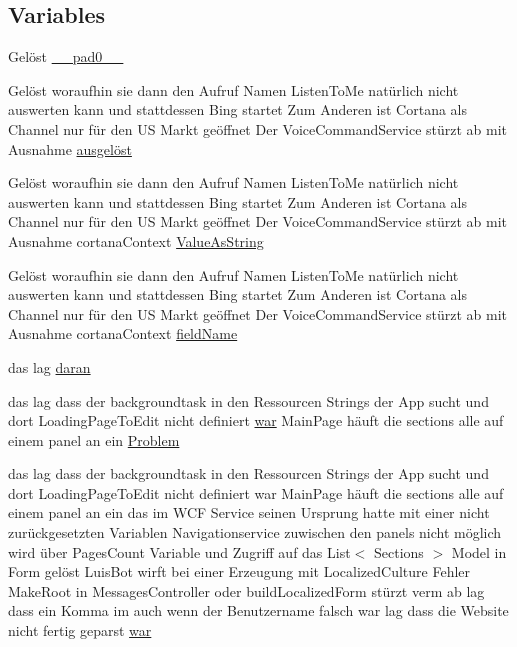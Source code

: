 \subsection*{Variables}
\begin{DoxyCompactItemize}
\item 
Gelöst \hyperlink{_r_e_a_d_m_e_8txt_a38ccef022a886075e294ad30cbfcae20}{\+\_\+\+\_\+pad0\+\_\+\+\_\+}
\item 
Gelöst woraufhin sie dann den Aufruf Namen Listen\+To\+Me natürlich nicht auswerten kann und stattdessen Bing startet Zum Anderen ist Cortana als Channel nur für den US Markt geöffnet Der Voice\+Command\+Service stürzt ab mit Ausnahme \hyperlink{_r_e_a_d_m_e_8txt_ae87c321689a82617b1f79b2274e0c802}{ausgelöst}
\item 
Gelöst woraufhin sie dann den Aufruf Namen Listen\+To\+Me natürlich nicht auswerten kann und stattdessen Bing startet Zum Anderen ist Cortana als Channel nur für den US Markt geöffnet Der Voice\+Command\+Service stürzt ab mit Ausnahme cortana\+Context \hyperlink{_r_e_a_d_m_e_8txt_a5efed622080494c17160e34d1aa15886}{Value\+As\+String}
\item 
Gelöst woraufhin sie dann den Aufruf Namen Listen\+To\+Me natürlich nicht auswerten kann und stattdessen Bing startet Zum Anderen ist Cortana als Channel nur für den US Markt geöffnet Der Voice\+Command\+Service stürzt ab mit Ausnahme cortana\+Context \hyperlink{_r_e_a_d_m_e_8txt_a225ecf32ab26301c2eb46c45696e77a2}{field\+Name}
\item 
das lag \hyperlink{_r_e_a_d_m_e_8txt_a135543df2f8a787ac2ddeaf87194562c}{daran}
\item 
das lag dass der backgroundtask in den Ressourcen Strings der App sucht und dort Loading\+Page\+To\+Edit nicht definiert \hyperlink{_r_e_a_d_m_e_8txt_a2a72fc7da943588cba8c302409b22e53}{war} Main\+Page häuft die sections alle auf einem panel an ein \hyperlink{_r_e_a_d_m_e_8txt_a86dd00a8c1f3448e32e23bece4a957d6}{Problem}
\item 
das lag dass der backgroundtask in den Ressourcen Strings der App sucht und dort Loading\+Page\+To\+Edit nicht definiert war Main\+Page häuft die sections alle auf einem panel an ein das im W\+CF Service seinen Ursprung hatte mit einer nicht zurückgesetzten Variablen Navigationservice zuwischen den panels nicht möglich wird über Pages\+Count Variable und Zugriff auf das List$<$ Sections $>$ Model in Form gelöst Luis\+Bot wirft bei einer Erzeugung mit Localized\+Culture Fehler Make\+Root in Messages\+Controller oder build\+Localized\+Form stürzt verm ab lag dass ein Komma im auch wenn der Benutzername falsch war lag dass die Website nicht fertig geparst \hyperlink{_r_e_a_d_m_e_8txt_a2a72fc7da943588cba8c302409b22e53}{war}

\end{DoxyCompactItemize}
